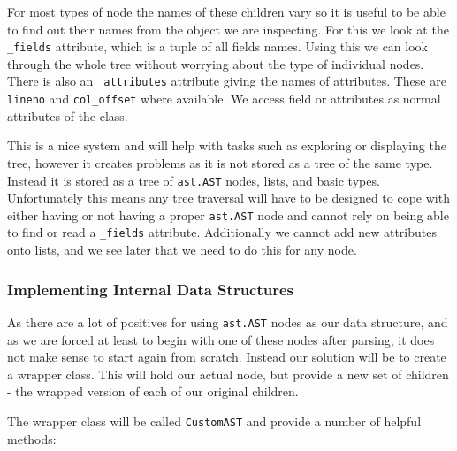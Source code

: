 \documentclass{report}
\begin{document}
For most types of node the names of these children vary so it is useful to be able to find out their names from the object we are inspecting. For this we
look at the \texttt{\_fields} attribute, which is a tuple of all fields names. Using this we can look through the whole tree without worrying about the type
of individual nodes. There is also an \texttt{\_attributes} attribute giving the names of attributes. These are \texttt{lineno} and \texttt{col\_offset} where
available. We access field or attributes as normal attributes of the class.

This is a nice system and will help with tasks such as exploring or displaying the tree, however it creates problems as it is not stored as a tree of the same
type. Instead it is stored as a tree of \texttt{ast.AST} nodes, lists, and basic types. Unfortunately this means any tree traversal will have to be designed to
cope with either having or not having a proper \texttt{ast.AST} node and cannot rely on being able to find or read a \texttt{\_fields} attribute. Additionally we
cannot add new attributes onto lists, and we see later that we need to do this for any node.

\subsubsection{Implementing Internal Data Structures}

As there are a lot of positives for using \texttt{ast.AST} nodes as our data structure, and as we are forced at least to begin with one of these nodes after parsing,
it does not make sense to start again from scratch. Instead our solution will be to create a wrapper class. This will hold our actual node, but provide a new set of
children - the wrapped version of each of our original children.

The wrapper class will be called \texttt{CustomAST} and provide a number of helpful methods:
\end{document}
